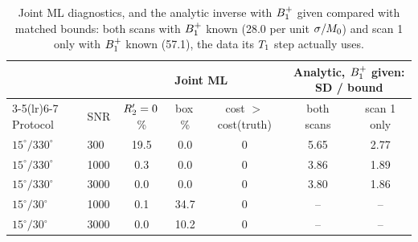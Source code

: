 \begin{table}[h]
\centering
\caption{Joint ML diagnostics, and the analytic inverse with $B_1^{+}$ given compared with matched bounds: both scans with $B_1^{+}$ known (28.0 per unit $\sigma/M_0$) and scan 1 only with $B_1^{+}$ known (57.1), the data its $T_1$ step actually uses.}
\label{tab:mcdiag}
\small
\begin{tabular}{llccccc}
\toprule
 & & \multicolumn{3}{c}{Joint ML} & \multicolumn{2}{c}{Analytic, $B_1^{+}$ given: SD / bound}\\
\cmidrule(lr){3-5}\cmidrule(lr){6-7}
Protocol & SNR & $R_2'=0$\,\% & box\,\% & cost $>$ cost(truth) & both scans & scan 1 only\\
\midrule
$15^\circ/330^\circ$ & 300 & 19.5 & 0.0 & 0 & 5.65 & 2.77\\
$15^\circ/330^\circ$ & 1000 & 0.3 & 0.0 & 0 & 3.86 & 1.89\\
$15^\circ/330^\circ$ & 3000 & 0.0 & 0.0 & 0 & 3.80 & 1.86\\
$15^\circ/30^\circ$ & 1000 & 0.1 & 34.7 & 0 & -- & --\\
$15^\circ/30^\circ$ & 3000 & 0.0 & 10.2 & 0 & -- & --\\
\bottomrule
\end{tabular}
\end{table}
